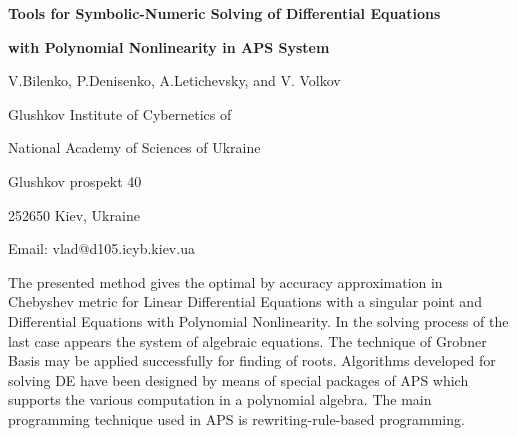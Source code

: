 

\centerline{\bf Tools for Symbolic-Numeric Solving of Differential Equations}
\centerline{\bf with Polynomial Nonlinearity in APS System}

\vskip 0.3cm

\centerline{V.Bilenko, P.Denisenko, A.Letichevsky, and V. Volkov}
\centerline{Glushkov Institute of Cybernetics of}
\centerline{National Academy of Sciences of Ukraine}
\centerline{Glushkov prospekt 40}
\centerline{252650 Kiev, Ukraine}
\centerline{Email: vlad@d105.icyb.kiev.ua}

\vskip 0.3cm

     The presented method gives the optimal by accuracy approximation in
Chebyshev metric for Linear Differential Equations with a singular
point and Differential Equations with Polynomial Nonlinearity.
In the solving process of the last case appears the system of algebraic
equations. The technique of Grobner Basis may be applied successfully for
finding of roots.
     Algorithms developed for solving DE  have been designed
by means of special packages of APS which supports the various computation
in a polynomial algebra. The main programming technique used in APS is
rewriting-rule-based programming.


